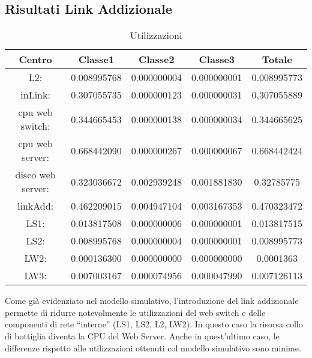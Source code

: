\subsection{Risultati Link Addizionale}
\begin{table}[htbp]
\begin{center}
\begin{tabular}{|c|c|c|c|c|}
\hline
Centro &Classe1 &Classe2 &Classe3 &Totale\\
\hline
\hline
L2: &0.008995768 &0.000000004 &0.000000001 &0.008995773\\
\hline
inLink: &0.307055735 &0.000000123 &0.000000031 &0,307055889\\
\hline
cpu web switch: &0.344665453 &0.000000138 &0.000000034 &0.344665625\\
\hline
cpu web server: &0.668442090 &0.000000267 &0.000000067 &0.668442424\\
\hline
disco web server: &0.323036672 &0.002939248 &0.001881830 &0.32785775\\
\hline
linkAdd: &0.462209015 &0.004947104 &0.003167353 &0.470323472\\
\hline
LS1: &0.013817508 &0.000000006 &0.000000001 &0.013817515\\
\hline
LS2: &0.008995768 &0.000000004 &0.000000001 &0.008995773\\
\hline
LW2: &0.000136300 &0.000000000 &0.000000000 &0.0001363\\
\hline
LW3: &0.007003167 &0.000074956 &0.000047990 &0.007126113\\
\hline
\end{tabular}
\end{center}
\caption{Utilizzazioni}
\label{utilizzazioni}
\end{table}
Come già evidenziato nel modello simulativo, l'introduzione del link addizionale permette di ridurre notevolmente le utilizzazioni del web switch e delle componenti di rete “interne” (LS1, LS2, L2, LW2). In questo caso la risorsa collo di bottiglia diventa la CPU del Web Server. Anche in quest'ultimo caso, le differenze rispetto alle utilizzazioni  ottenuti col modello simulativo sono minime.
